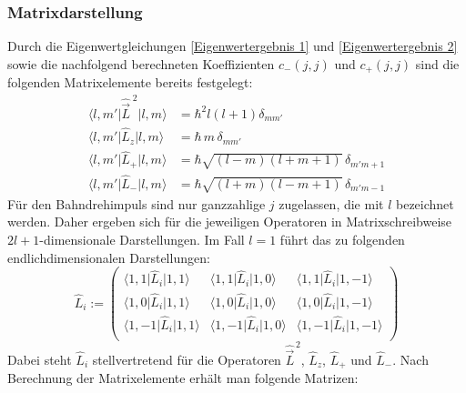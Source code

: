 \documentclass[9pt]{report}
\begin{document}
\subsubsection{Matrixdarstellung}
Durch die Eigenwertgleichungen \eqref{Eigenwertergebnis 1} und \eqref{Eigenwertergebnis 2} sowie die nachfolgend berechneten Koeffizienten $c_{-}(j,j)$ und $c_{+}(j,j)$ sind die folgenden Matrixelemente bereits festgelegt:
\begin{align}
\big\langle l,m'\big|\hat{\vec{L}}^{\;2}\big|l,m\big\rangle &= \hbar^{2}l(l+1)\delta_{mm'}\\
\big\langle l,m'\big|\hat{L}_{z}\big|l,m\big\rangle &= \hbar \,m\,\delta_{mm'}\\
\big\langle l,m'\big|\hat{L}_{+}\big|l,m\big\rangle &= \hbar\sqrt{(l-m)(l+m+1)}\,\delta_{m'm+1}\\
\big\langle l,m'\big|\hat{L}_{-}\big|l,m\big\rangle &= \hbar\sqrt{(l+m)(l-m+1)}\,\delta_{m'm-1}
\end{align}
Für den Bahndrehimpuls sind nur ganzzahlige $j$ zugelassen, die mit $l$ bezeichnet werden. Daher ergeben sich für die jeweiligen Operatoren in Matrixschreibweise $2l+1$-dimensionale Darstellungen. Im Fall $l=1$ führt das zu folgenden endlichdimensionalen Darstellungen:
\begin{equation}
\renewcommand{\arraystretch}{1.4}
\hat{L}_i:=
\left(\begin{array}{ccc}
\big\langle 1,1\big|\hat{L}_i\big|1,1\big\rangle 
&
\big\langle 1,1\big|\hat{L}_i\big|1,0\big\rangle
&
\big\langle 1,1\big|\hat{L}_i\big|1,-1\big\rangle
\\
\big\langle 1,0\big|\hat{L}_i\big|1,1\big\rangle
& 
\big\langle 1,0\big|\hat{L}_i\big|1,0\big\rangle
& 
\big\langle 1,0\big|\hat{L}_i\big|1,-1\big\rangle
\\
\big\langle 1,-1\big|\hat{L}_i\big|1,1\big\rangle
& 
\big\langle 1,-1\big|\hat{L}_i\big|1,0\big\rangle
& 
\big\langle 1,-1\big|\hat{L}_i\big|1,-1\big\rangle
\\\end{array}\right)
\end{equation}
Dabei steht $\hat{L}_i$ stellvertretend für die Operatoren $\hat{\vec{L}}^{\,2}$, $\hat{L}_{z}$, $\hat{L}_{+}$ und $\hat{L}_{-}$. Nach Berechnung der Matrixelemente erhält man folgende Matrizen:
\end{document}
